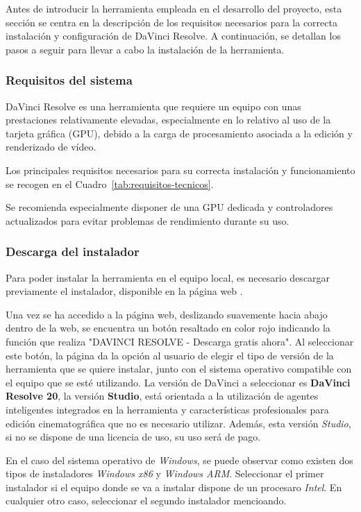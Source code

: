 
Antes de introducir la herramienta empleada en el desarrollo del proyecto, esta sección se 
centra en la descripción de los requisitos necesarios para la correcta instalación y 
configuración de DaVinci Resolve. A continuación, se detallan los pasos a seguir para llevar 
a cabo la instalación de la herramienta.

\subsubsection*{Requisitos del sistema}
DaVinci Resolve es una herramienta que requiere un equipo con unas prestaciones 
relativamente elevadas, especialmente en lo relativo al uso de la tarjeta gráfica (GPU), 
debido a la carga de procesamiento asociada a la edición y renderizado de vídeo.

Los principales requisitos necesarios para su correcta instalación y funcionamiento se 
recogen en el Cuadro~\ref{tab:requisitos-tecnicos}.

Se recomienda especialmente disponer de una GPU dedicada y controladores actualizados 
para evitar problemas de rendimiento durante su uso.

\subsubsection*{Descarga del instalador}
Para poder instalar la herramienta en el equipo local, es necesario descargar previamente 
el instalador, disponible en la página web \cite{davinci-installer}.

Una vez se ha accedido a la página web, deslizando suavemente hacia abajo dentro de la web, 
se encuentra un botón resaltado en color rojo indicando la función que realiza 
"DAVINCI RESOLVE - Descarga gratis ahora". 
Al seleccionar este botón, la página da la opción al usuario de elegir el tipo de versión 
de la herramienta que se quiere instalar, junto con el sistema operativo compatible con 
el equipo que se esté utilizando.
La versión de DaVinci a seleccionar es \textbf{DaVinci Resolve 20}, la versión \textbf{Studio}, 
está orientada a la utilización de agentes inteligentes integrados en la herramienta y 
características profesionales para edición cinematográfica que no es necesario utilizar. Además, 
esta versión \textit{Studio}, si no se dispone de una licencia de uso, su uso será de pago.

En el caso del sistema operativo de \textit{Windows}, se puede observar como existen dos 
tipos de instaladores \textit{Windows x86} y \textit{Windows ARM}. Seleccionar el primer 
instalador si el equipo donde se va a instalar dispone de un procesaro \textit{Intel}. En cualquier otro caso, seleccionar el segundo instalador mencioando.

